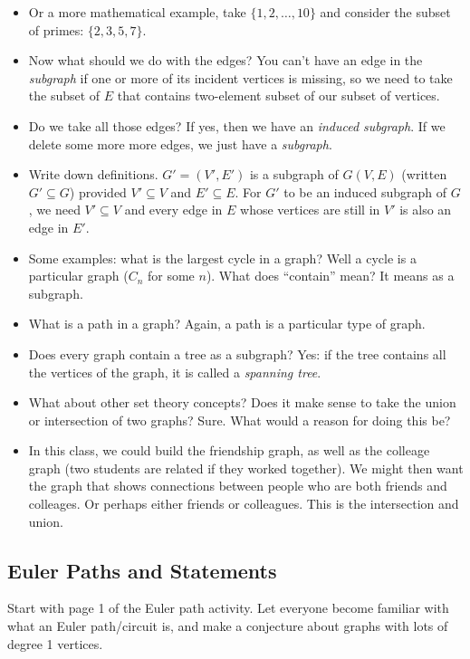 \documentclass[12pt]{article}
\theoremstyle{plain}
\theoremstyle{definition}
\theoremstyle{remark}
\newcommand{\todayis}[1]{\clearpage{\rhead{\footnotesize #1}}}
\begin{document}
\begin{itemize}
  \item Or a more mathematical example, take $\{1,2,\ldots, 10\}$ and consider the subset of primes: $\{2, 3, 5, 7\}$.
  \item Now what should we do with the edges?  You can't have an edge in the \emph{subgraph} if one or more of its incident vertices is missing, so we need to take the subset of $E$ that contains two-element subset of our subset of vertices.
  \item Do we take all those edges?  If yes, then we have an \emph{induced subgraph}.  If we delete some more more edges, we just have a \emph{subgraph}.
  \item Write down definitions.  $G' = (V', E')$ is a subgraph of $G(V,E)$ (written $G' \subseteq G$) provided $V' \subseteq V$ and $E' \subseteq E$.  For $G'$ to be an induced subgraph of $G$, we need $V' \subseteq V$ and every edge in $E$ whose vertices are still in $V'$ is also an edge in $E'$.
  \item Some examples: what is the largest cycle in a graph?  Well a cycle is a particular graph ($C_n$ for some $n$).  What does ``contain'' mean?  It means as a subgraph.
  \item What is a path in a graph?  Again, a path is a particular type of graph.
  \item Does every graph contain a tree as a subgraph?  Yes: if the tree contains all the vertices of the graph, it is called a \emph{spanning tree}.
  \item What about other set theory concepts?  Does it make sense to take the union or intersection of two graphs?  Sure.  What would a reason for doing this be?
  \item In this class, we could build the friendship graph, as well as the colleage graph (two students are related if they worked together).  We might then want the graph that shows connections between people who are both friends and colleages.  Or perhaps either friends or colleagues.  This is the intersection and union.
\end{itemize}



\todayis{Monday, August 27}

\subsection*{Euler Paths and Statements}

Start with page 1 of the Euler path activity.  Let everyone become familiar with what an Euler path/circuit is, and make a conjecture about graphs with lots of degree 1 vertices.
\end{document}
